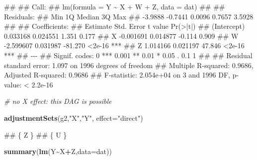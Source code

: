 \documentclass[
]{book}
\newenvironment{Shaded}{\begin{snugshade}}{\end{snugshade}}
\newcommand{\AttributeTok}[1]{\textcolor[rgb]{0.13,0.29,0.53}{#1}}
\newcommand{\CommentTok}[1]{\textcolor[rgb]{0.56,0.35,0.01}{\textit{#1}}}
\newcommand{\FunctionTok}[1]{\textcolor[rgb]{0.13,0.29,0.53}{\textbf{#1}}}
\newcommand{\NormalTok}[1]{#1}
\newcommand{\SpecialCharTok}[1]{\textcolor[rgb]{0.81,0.36,0.00}{\textbf{#1}}}
\newcommand{\StringTok}[1]{\textcolor[rgb]{0.31,0.60,0.02}{#1}}
\begin{document}
\begin{Shaded}
\begin{Highlighting}[]
\NormalTok{\#\# }
\NormalTok{\#\# Call:}
\NormalTok{\#\# lm(formula = Y \textasciitilde{} X + W + Z, data = dat)}
\NormalTok{\#\# }
\NormalTok{\#\# Residuals:}
\NormalTok{\#\#     Min      1Q  Median      3Q     Max }
\NormalTok{\#\# {-}3.9888 {-}0.7441  0.0096  0.7657  3.5928 }
\NormalTok{\#\# }
\NormalTok{\#\# Coefficients:}
\NormalTok{\#\#              Estimate Std. Error t value Pr(\textgreater{}|t|)    }
\NormalTok{\#\# (Intercept)  0.033168   0.024551   1.351    0.177    }
\NormalTok{\#\# X           {-}0.001691   0.014877  {-}0.114    0.909    }
\NormalTok{\#\# W           {-}2.599607   0.031987 {-}81.270   \textless{}2e{-}16 ***}
\NormalTok{\#\# Z            1.014166   0.021197  47.846   \textless{}2e{-}16 ***}
\NormalTok{\#\# {-}{-}{-}}
\NormalTok{\#\# Signif. codes:  0 \textquotesingle{}***\textquotesingle{} 0.001 \textquotesingle{}**\textquotesingle{} 0.01 \textquotesingle{}*\textquotesingle{} 0.05 \textquotesingle{}.\textquotesingle{} 0.1 \textquotesingle{} \textquotesingle{} 1}
\NormalTok{\#\# }
\NormalTok{\#\# Residual standard error: 1.097 on 1996 degrees of freedom}
\NormalTok{\#\# Multiple R{-}squared:  0.9686, Adjusted R{-}squared:  0.9686 }
\NormalTok{\#\# F{-}statistic: 2.054e+04 on 3 and 1996 DF,  p{-}value: \textless{} 2.2e{-}16}
\end{Highlighting}
\end{Shaded}

\begin{Shaded}
\begin{Highlighting}[]
\CommentTok{\# no X effect: this DAG is possible}

\FunctionTok{adjustmentSets}\NormalTok{(g2,}\StringTok{"X"}\NormalTok{,}\StringTok{"Y"}\NormalTok{, }\AttributeTok{effect=}\StringTok{"direct"}\NormalTok{)}
\end{Highlighting}
\end{Shaded}

\begin{Shaded}
\begin{Highlighting}[]
\NormalTok{\#\# \{ Z \}}
\NormalTok{\#\# \{ U \}}
\end{Highlighting}
\end{Shaded}

\begin{Shaded}
\begin{Highlighting}[]
\FunctionTok{summary}\NormalTok{(}\FunctionTok{lm}\NormalTok{(Y}\SpecialCharTok{\textasciitilde{}}\NormalTok{X}\SpecialCharTok{+}\NormalTok{Z,}\AttributeTok{data=}\NormalTok{dat))}
\end{Highlighting}
\end{Shaded}
\end{document}
